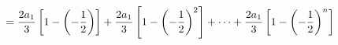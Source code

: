 \documentclass[preview]{standalone}
\begin{document}
\begin{align*}
\special{dvisvgm:raw <g id='unique000'>}=\frac{2a_1}{3}\left[1-\left(-\frac{1}{2}\right)\right]+\frac{2a_1}{3}\left[1-\left(-\frac{1}{2}\right)^2\right]+\cdots+\frac{2a_1}{3}\left[1-\left(-\frac{1}{2}\right)^n\right]\special{dvisvgm:raw </g>}
\end{align*}
\end{document}
